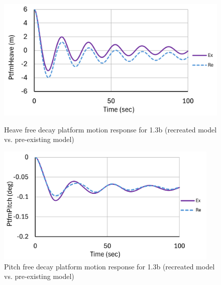 \documentclass[a4paper, 11pt]{article}
\begin{document}
\begin{figure}[H]
    \begin{minipage}{0.47\textwidth}
        \centering
        \includegraphics[width=1\textwidth]{1.3b_heave_mine_1.png}
        \caption{\small Heave free decay platform motion response for 1.3b (recreated model vs. pre-existing model)}
        \label{fig:1.3b_heave_mine_recreated}
    \end{minipage}
    \hfill
    \begin{minipage}{0.49\textwidth}
        \centering
        \includegraphics[width=0.95\textwidth]{1.3b_pitch_mine_1.png}
        \caption{\small Pitch free decay platform motion response for 1.3b (recreated model vs. pre-existing model)}
        \label{fig:1.3b_pitch_mine_recreated}
    \end{minipage}
\end{figure}
\end{document}
